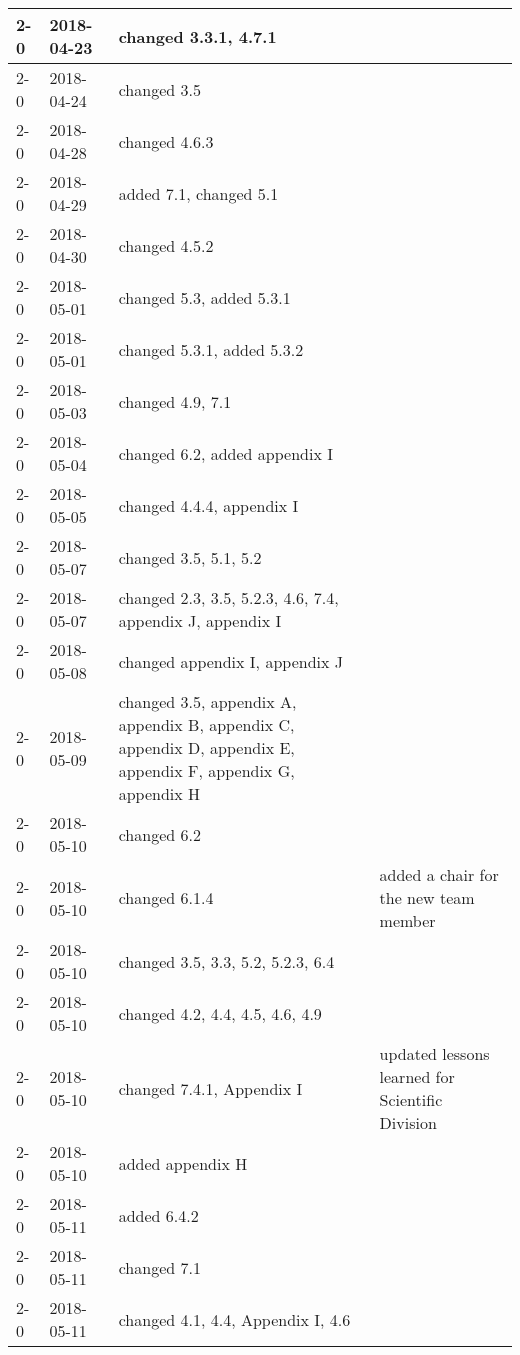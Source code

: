 \begin{longtable}{|p{}| p{} |p{} |p{}|}
    2-0     &   2018-04-23   & changed 3.3.1, 4.7.1 &\\\hline
    2-0     &   2018-04-24   & changed 3.5  & \\\hline
    2-0     &   2018-04-28   & changed 4.6.3 & \\\hline
    2-0     &   2018-04-29   & added 7.1, changed 5.1 &   \\\hline
    2-0     &   2018-04-30   & changed 4.5.2 &   \\\hline
    2-0     &   2018-05-01   & changed 5.3, added 5.3.1 &   \\\hline
    2-0     &   2018-05-01   & changed 5.3.1, added 5.3.2 &   \\\hline
    2-0     &   2018-05-03   & changed 4.9, 7.1 & \\\hline
    2-0     &   2018-05-04   & changed 6.2, added appendix I & \\\hline
    2-0     &   2018-05-05   & changed 4.4.4, appendix I & \\\hline
    2-0     &   2018-05-07   & changed 3.5, 5.1, 5.2 & \\\hline
    2-0     &   2018-05-07   & changed 2.3, 3.5, 5.2.3, 4.6, 7.4, appendix J, appendix I & \\\hline
    2-0     &   2018-05-08   & changed appendix I, appendix J & \\\hline
    2-0     &   2018-05-09   & changed 3.5, appendix A, appendix B, appendix C, appendix D, appendix E, appendix F, appendix G, appendix H  & \\\hline
    2-0     &   2018-05-10   & changed 6.2 & \\\hline
    2-0     &   2018-05-10   & changed 6.1.4 & added a chair for the new team member  \\\hline
    2-0     &   2018-05-10   & changed 3.5, 3.3,  5.2, 5.2.3, 6.4  & \\\hline
    2-0     &   2018-05-10   & changed 4.2, 4.4, 4.5, 4.6, 4.9 & \\\hline
    2-0     &   2018-05-10   & changed 7.4.1, Appendix I & updated lessons learned for Scientific Division  \\\hline
     2-0     &   2018-05-10   & added appendix H &  \\\hline
    2-0     &   2018-05-11   & added 6.4.2 &  \\\hline
    2-0     &   2018-05-11   & changed 7.1 &  \\\hline
    2-0     &   2018-05-11   & changed 4.1, 4.4,  Appendix I, 4.6 &  \\\hline

\end{longtable}
